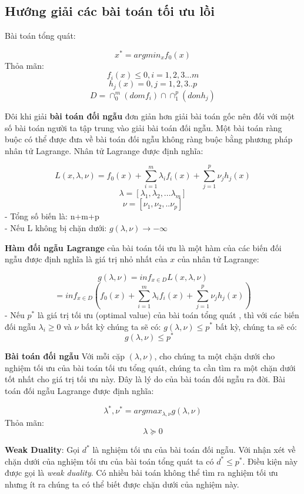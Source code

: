 \documentclass[a4paper, 12pt, oneside]{report}
\begin{document}
\subsection{Hướng giải các bài toán tối ưu lồi} 
Bài toán tổng quát: 
\begin{mybox}
$$ x^* = argmin_x f_0(x) $$
    Thỏa mãn: $$f_i(x) \leq 0 , i = 1,2,3...m$$
    $$h_j(x) = 0, j = 1,2,3..p$$
    $$ D = \cap_0^m (dom f_i) \cap \cap_1^p(don h_j) $$
\end{mybox}
Đôi khi giải \textbf{bài toán đối ngẫu} đơn giản hơn giải bài toán gốc nên đối với một số bài toán người ta tập trung vào giải bài toán đối ngẫu. Một bài toán ràng buộc có thể được đưa về bài toán đối ngẫu không ràng buộc bằng phương pháp nhân tử Lagrange. Nhân tử Lagrange được định nghĩa:
\begin{mybox}
$$ L(x,\lambda,\nu) = f_0(x) + \sum_{i=1}^{m}{\lambda_i f_i(x)} + \sum_{j=1}^{p}{\nu_j h_j(x)}$$
$$ \lambda = [\lambda_1, \lambda_2,...\lambda_m]$$
$$ \nu = [\nu_1,\nu_2,..\nu_p] $$
- Tổng số biến là: n+m+p\\
- Nếu L không bị chặn dưới: $g(\lambda,\nu) \rightarrow -\infty$\\
\end{mybox}
\textbf{Hàm đối ngẫu Lagrange} của bài toán tối ưu là một hàm của các biến đối ngẫu được định nghĩa là giá trị nhỏ nhất của $x$ của nhân tử Lagrange:
\begin{mybox}
$$ g(\lambda,\nu) = inf_{x\in D}L(x,\lambda,\nu) $$
$$ = inf_{x\in D}(f_0(x) + \sum_{i=1}^{m}{\lambda_i f_i(x)} + \sum_{j=1}^{p}{\nu_j h_j(x)})$$
- Nếu $p^*$ là giá trị tối ưu (optimal value) của bài toán tổng quát
, thì với các biến đối ngẫu $\lambda_i \geq 0$ và $\nu$ bất kỳ chúng ta sẽ có:
$g(\lambda,\nu) \leq p^*$
 bất kỳ, chúng ta sẽ có:
 $$g(\lambda, \nu) \leq p^*~~~~ $$
\end{mybox}
\textbf{Bài toán đối ngẫu} Với mỗi cặp $(\lambda,\nu)$, cho chúng ta một chặn dưới cho nghiệm tối ưu của bài toán tối ưu tổng quát, chúng ta cần tìm ra một chặn dưới tốt nhất cho giá trị tối ưu này. Đây là lý do của bài toán đối ngẫu ra đời. Bài toán đối ngẫu Lagrange được định nghĩa:
\begin{mybox}
$$ \lambda ^*, \nu ^* = argmax_{\lambda,\nu} g(\lambda,\nu) $$
Thỏa mãn: $$ \lambda \succeq 0 $$
\end{mybox}
\textbf{Weak Duality}: Gọi $d^*$ là nghiệm tối ưu của bài toán đối ngẫu. Với nhận xét về chặn dưới của nghiệm tối ưu của bài toán tổng quát ta có $d^* \leq p^*$. Điều kiện này được gọi là \textit{weak duality}. Có nhiều bài toán không thể tìm ra nghiệm tối ưu nhưng ít ra chúng ta có thể biết được chặn dưới của nghiệm này.\\ \\
\end{document}
